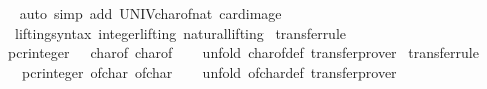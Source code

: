 \begin{isabellebody}
%
\isadelimproof
\ \ %
\endisadelimproof
%
\isatagproof
{}\isamarkupfalse%
\ {\isacharparenleft}{\kern0pt}auto\ simp\ add{\isacharcolon}{\kern0pt}\ UNIV{\isacharunderscore}{\kern0pt}char{\isacharunderscore}{\kern0pt}of{\isacharunderscore}{\kern0pt}nat\ card{\isacharunderscore}{\kern0pt}image{\isacharparenright}{\kern0pt}%
\endisatagproof
{\isafoldproof}%
%
\isadelimproof
\isanewline
%
\endisadelimproof
\isanewline
{}\isamarkupfalse%
\isanewline
\ \ \ lifting{\isacharunderscore}{\kern0pt}syntax\ integer{\isachardot}{\kern0pt}lifting\ natural{\isachardot}{\kern0pt}lifting\isanewline
{}\isanewline
\isanewline
{}\isamarkupfalse%
\ {\isacharbrackleft}{\kern0pt}transfer{\isacharunderscore}{\kern0pt}rule{\isacharbrackright}{\kern0pt}{\isacharcolon}{\kern0pt}\isanewline
\ \ {\isacartoucheopen}{\isacharparenleft}{\kern0pt}pcr{\isacharunderscore}{\kern0pt}integer\ {\isacharequal}{\kern0pt}{\isacharequal}{\kern0pt}{\isacharequal}{\kern0pt}{\isachargreater}{\kern0pt}\ {\isacharparenleft}{\kern0pt}{\isacharequal}{\kern0pt}{\isacharparenright}{\kern0pt}{\isacharparenright}{\kern0pt}\ char{\isacharunderscore}{\kern0pt}of\ char{\isacharunderscore}{\kern0pt}of{\isacartoucheclose}\isanewline
%
\isadelimproof
\ \ %
\endisadelimproof
%
\isatagproof
{}\isamarkupfalse%
\ {\isacharparenleft}{\kern0pt}unfold\ char{\isacharunderscore}{\kern0pt}of{\isacharunderscore}{\kern0pt}def{\isacharparenright}{\kern0pt}\ transfer{\isacharunderscore}{\kern0pt}prover%
\endisatagproof
{\isafoldproof}%
%
\isadelimproof
\isanewline
%
\endisadelimproof
\isanewline
{}\isamarkupfalse%
\ {\isacharbrackleft}{\kern0pt}transfer{\isacharunderscore}{\kern0pt}rule{\isacharbrackright}{\kern0pt}{\isacharcolon}{\kern0pt}\isanewline
\ \ {\isacartoucheopen}{\isacharparenleft}{\kern0pt}{\isacharparenleft}{\kern0pt}{\isacharequal}{\kern0pt}{\isacharparenright}{\kern0pt}\ {\isacharequal}{\kern0pt}{\isacharequal}{\kern0pt}{\isacharequal}{\kern0pt}{\isachargreater}{\kern0pt}\ pcr{\isacharunderscore}{\kern0pt}integer{\isacharparenright}{\kern0pt}\ of{\isacharunderscore}{\kern0pt}char\ of{\isacharunderscore}{\kern0pt}char{\isacartoucheclose}\isanewline
%
\isadelimproof
\ \ %
\endisadelimproof
%
\isatagproof
{}\isamarkupfalse%
\ {\isacharparenleft}{\kern0pt}unfold\ of{\isacharunderscore}{\kern0pt}char{\isacharunderscore}{\kern0pt}def{\isacharparenright}{\kern0pt}\ transfer{\isacharunderscore}{\kern0pt}prover%
\endisatagproof
{\isafoldproof}%
%
\isadelimproof
\isanewline
%
\endisadelimproof
\isanewline

\end{isabellebody}

